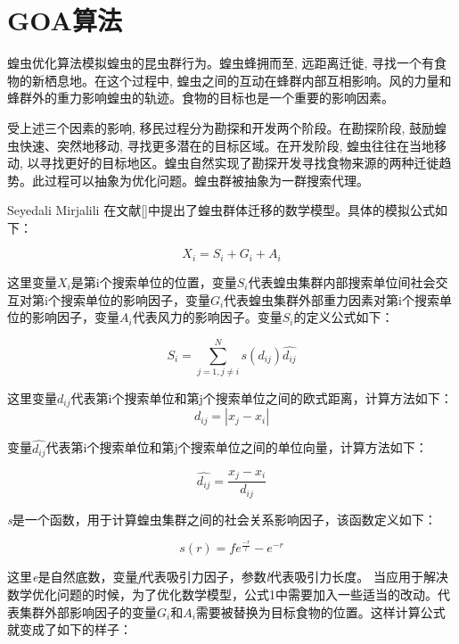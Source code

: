 \section{GOA算法}

蝗虫优化算法模拟蝗虫的昆虫群行为。蝗虫蜂拥而至, 远距离迁徙, 寻找一个有食物的新栖息地。在这个过程中, 蝗虫之间的互动在蜂群内部互相影响。风的力量和蜂群外的重力影响蝗虫的轨迹。食物的目标也是一个重要的影响因素。

受上述三个因素的影响, 移民过程分为勘探和开发两个阶段。在勘探阶段, 鼓励蝗虫快速、突然地移动, 寻找更多潜在的目标区域。在开发阶段, 蝗虫往往在当地移动, 以寻找更好的目标地区。蝗虫自然实现了勘探开发寻找食物来源的两种迁徙趋势。此过程可以抽象为优化问题。蝗虫群被抽象为一群搜索代理。

Seyedali Mirjalili 在文献[]中提出了蝗虫群体迁移的数学模型。具体的模拟公式如下：

\begin{equation}
    X_i = S_i + G_i + A_i 
\end{equation}

这里变量$X_i$是第i个搜索单位的位置，变量$S_i$代表蝗虫集群内部搜索单位间社会交互对第i个搜索单位的影响因子，变量$G_i$代表蝗虫集群外部重力因素对第i个搜索单位的影响因子，变量$A_i$代表风力的影响因子。变量$S_i$的定义公式如下：

\begin{equation}
    S_i = \sum_{j=1, j\neq{i}}^N s(d_{ij})\widehat{d_{ij}}
\end{equation}

这里变量$d_{ij}$代表第i个搜索单位和第j个搜索单位之间的欧式距离，计算方法如下：
\begin{equation}
    d_{ij}=|x_j-x_i|
\end{equation}

变量$\widehat{d_{ij}}$代表第i个搜索单位和第j个搜索单位之间的单位向量，计算方法如下：

\begin{equation}
    \widehat{d_{ij}}=\frac{x_j-x_i}{d_{ij}}
\end{equation}

\emph{s}是一个函数，用于计算蝗虫集群之间的社会关系影响因子，该函数定义如下：

\begin{equation}
    s(r) = fe^{\frac{-r}{l}}-e^{-r}
\end{equation}

这里\emph{e}是自然底数，变量\emph{f}代表吸引力因子，参数\emph{l}代表吸引力长度。
当应用于解决数学优化问题的时候，为了优化数学模型，公式1中需要加入一些适当的改动。代表集群外部影响因子的变量$G_i$和$A_i$需要被替换为目标食物的位置。这样计算公式就变成了如下的样子：


